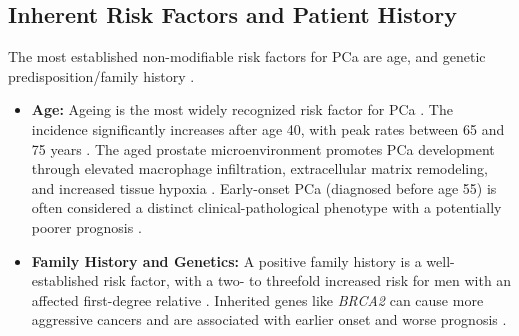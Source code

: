 \documentclass[11pt, a4paper]{article}
\begin{document}
\subsection{Inherent Risk Factors and Patient History}
The most established non-modifiable risk factors for PCa are age, and genetic predisposition/family history \cite{UnknownAuthor2017, PerezCornagoDunneram2021}.
\begin{itemize}
    \item \textbf{Age:} Ageing is the most widely recognized risk factor for PCa \cite{UnknownAuthor2017, KaderBrangsch2021}. The incidence significantly increases after age 40, with peak rates between 65 and 75 years \cite{BianchiFriasDamodarasamy2019, UnknownAuthor2017}. The aged prostate microenvironment promotes PCa development through elevated macrophage infiltration, extracellular matrix remodeling, and increased tissue hypoxia \cite{BianchiFriasDamodarasamy2019, MartinCaraballo2024}. Early-onset PCa (diagnosed before age 55) is often considered a distinct clinical-pathological phenotype with a potentially poorer prognosis \cite{OrzechowskaAnusewicz2022, MilonasVenclovas2017}.
    \item \textbf{Family History and Genetics:} A positive family history is a well-established risk factor, with a two- to threefold increased risk for men with an affected first-degree relative \cite{CarpagnanoEusebi2020, UnknownAuthor2017}. Inherited genes like \textit{BRCA2} can cause more aggressive cancers and are associated with earlier onset and worse prognosis \cite{UnknownAuthor2017, CarpagnanoEusebi2020, JiHuang2017, ChenWang2023}.
\end{itemize}
\end{document}
